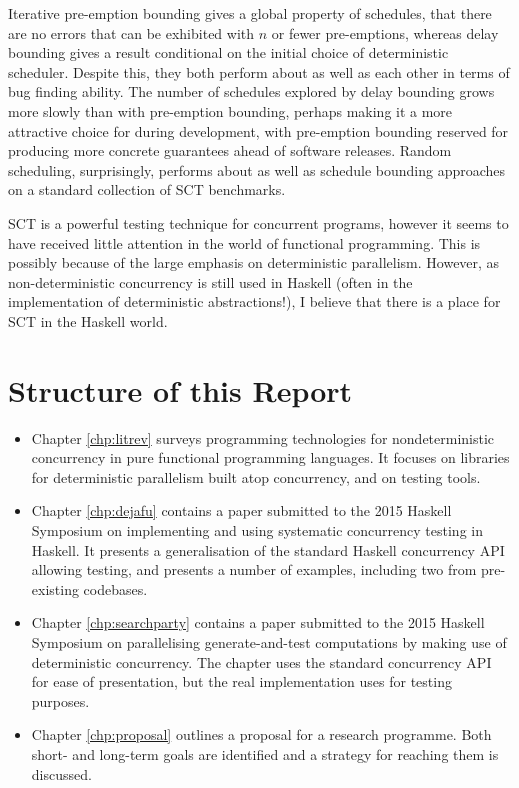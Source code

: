 Iterative pre-emption bounding gives a global property of schedules,
that there are no errors that can be exhibited with $n$ or fewer
pre-emptions, whereas delay bounding gives a result conditional on the
initial choice of deterministic scheduler. Despite this, they both
perform about as well as each other in terms of bug finding
ability\cite{empirical}. The number of schedules explored by delay
bounding grows more slowly than with pre-emption
bounding\cite{dbound}, perhaps making it a more attractive choice for
during development, with pre-emption bounding reserved for producing
more concrete guarantees ahead of software releases. Random
scheduling, surprisingly, performs about as well as schedule bounding
approaches on a standard collection of SCT benchmarks\cite{empirical}.

SCT is a powerful testing technique for concurrent programs, however
it seems to have received little attention in the world of functional
programming. This is possibly because of the large emphasis on
deterministic parallelism. However, as non-deterministic concurrency
is still used in Haskell (often in the implementation of deterministic
abstractions!), I believe that there is a place for SCT in the Haskell
world.

\section{Structure of this Report}
\label{sec:intro-outline}

\begin{itemize}
  \item Chapter \ref{chp:litrev} surveys programming technologies for
    nondeterministic concurrency in pure functional programming
    languages. It focuses on libraries for deterministic parallelism
    built atop concurrency, and on testing tools.

  \item Chapter \ref{chp:dejafu} contains a paper submitted to the
    2015 Haskell Symposium\cite{dejafu} on implementing and using
    systematic concurrency testing in Haskell. It presents a
    generalisation of the standard Haskell concurrency API allowing
    testing, and presents a number of examples, including two from
    pre-existing codebases.

  \item Chapter \ref{chp:searchparty} contains a paper submitted to
    the 2015 Haskell Symposium\cite{searchparty} on parallelising
    generate-and-test computations by making use of deterministic
    concurrency. The chapter uses the standard concurrency API for
    ease of presentation, but the real implementation uses \dejafu{}
    for testing purposes.

  \item Chapter \ref{chp:proposal} outlines a proposal for a research
    programme. Both short- and long-term goals are identified and a
    strategy for reaching them is discussed.
\end{itemize}
